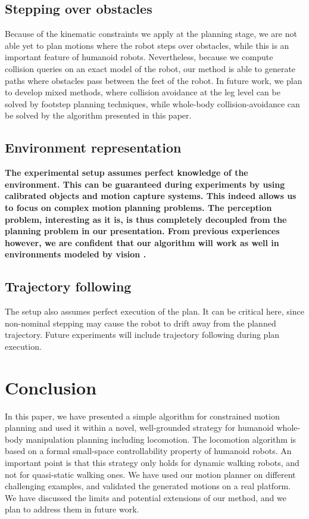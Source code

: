 \documentclass{article}
\begin{document}
\subsection{Stepping over obstacles}

Because of the kinematic constraints we apply at the planning stage, we are not
able yet to plan motions where the robot steps over obstacles, while this is an 
important feature of humanoid robots. Nevertheless, because we compute collision queries on
an exact model of the robot, our method is able to generate paths where obstacles
pass between the feet of the robot.
In future work, we plan to develop mixed
methods, where collision avoidance at the leg level can be solved by footstep
planning techniques, while whole-body collision-avoidance can be solved by the
algorithm presented in this paper.

\subsection{Environment representation}

\textbf{The experimental setup assumes perfect knowledge of the
  environment. This can be guaranteed during experiments by using
  calibrated objects and motion capture systems. This indeed allows us
  to focus on complex motion planning problems. The perception
  problem, interesting as it is, is thus completely decoupled from the
  planning problem in our presentation. From previous experiences
  however, we are confident that our algorithm will work as well in
  environments modeled by vision \cite{Nakhei4755945,DanLauLam2012}.}

\subsection{Trajectory following}

The setup also assumes perfect execution of the plan. It can be
critical here, since non-nominal stepping may cause the robot to drift
away from the planned trajectory. Future experiments will include
trajectory following during plan execution.

\section{Conclusion}

In this paper, we have presented a simple algorithm for constrained motion planning
and used it within a novel, well-grounded strategy for humanoid whole-body
manipulation planning including locomotion. The locomotion algorithm is based on a formal
small-space controllability property of humanoid robots. An important point is that
this strategy only holds for dynamic walking robots, and not for quasi-static walking ones.
We have used our motion planner on different challenging examples, and validated the
generated motions on a real platform. We have discussed the limits and potential extensions
of our method, and we plan to address them in future work.
\end{document}
